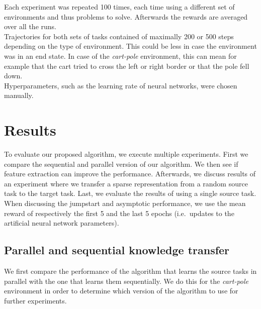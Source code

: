 Each experiment was repeated 100 times, each time using a different set of environments and thus problems to solve.
Afterwards the rewards are averaged over all the runs.\\
Trajectories for both sets of tasks contained of maximally 200 or 500 steps depending on the type of environment.
This could be less in case the environment was in an end state.
In case of the \emph{cart-pole} environment, this can mean for example that the cart tried to cross the left or right border or that the pole fell down.\\
Hyperparameters, such as the learning rate of neural networks, were chosen manually.

\section{Results}
To evaluate our proposed algorithm, we execute multiple experiments. First we compare the sequential and parallel version of our algorithm. We then see if feature extraction can improve the performance. Afterwards, we discuss results of an experiment where we transfer a sparse representation from a random source task to the target task. Last, we evaluate the results of using a single source task.\\
When discussing the jumpstart and asymptotic performance, we use the mean reward of respectively the first 5 and the last 5 epochs (i.e.\ updates to the artificial neural network parameters).

\subsection{Parallel and sequential knowledge transfer} %
\label{sub:parallel_and_sequential_knowledge_transfer}
We first compare the performance of the algorithm that learns the source tasks in parallel with the one that learns them sequentially. We do this for the \emph{cart-pole} environment in order to determine which version of the algorithm to use for further experiments.

